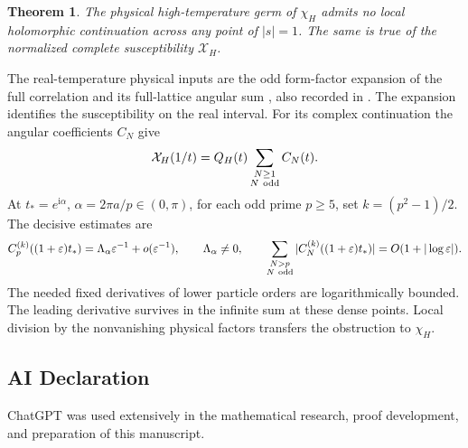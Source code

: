 \documentclass[11pt]{article}
\numberwithin{equation}{section}
\newtheorem{theorem}{Theorem}[section]
\theoremstyle{remark}\newtheorem{remark}[theorem]{Remark}
\newcommand{\ii}{\mathrm i}
\newcommand{\X}{\mathcal X_H}
\begin{document}
\begin{theorem}\label{thm:main}
The physical high-temperature germ of $\chi_H$ admits no local
holomorphic continuation across any point of $|s|=1$.
The same is true of the normalized complete susceptibility $\X$.
\end{theorem}

The real-temperature physical inputs are the odd form-factor
expansion of the full correlation and its full-lattice angular
sum \cite[eqs.~(1.9), (1.11), (3.13), (3.17)--(3.20),
(4.1)--(4.2)]{Orrick}, also recorded in
\cite[eqs.~(3), (5)--(9)]{Boukraa}. The expansion identifies the
susceptibility on the real interval. For its complex continuation the
angular coefficients $C_N$ give
\[
 \X(1/t)=Q_H(t)\sum_{\substack{N\ge1\\N\ {\rm odd}}}C_N(t).
\]
At $t_*=e^{\ii\alpha}$, $\alpha=2\pi a/p\in(0,\pi)$, for each
odd prime $p\ge5$, set $k=(p^2-1)/2$. The decisive estimates are
\[
 C_p^{(k)}((1+\varepsilon)t_*)
       =\Lambda_\alpha\varepsilon^{-1}+o(\varepsilon^{-1}),
 \qquad \Lambda_\alpha\ne0,
 \qquad
 \sum_{\substack{N>p\\N\ {\rm odd}}}|C_N^{(k)}((1+\varepsilon)t_*)|
       =O(1+|\log\varepsilon|).
\]
The needed fixed derivatives of lower particle orders are logarithmically bounded.
The leading derivative survives in the infinite sum at these dense
points. Local division by the nonvanishing physical factors
transfers the obstruction to $\chi_H$.

\subsection*{AI Declaration}
ChatGPT was used extensively in the mathematical research, proof development,
and preparation of this manuscript.
\end{document}
